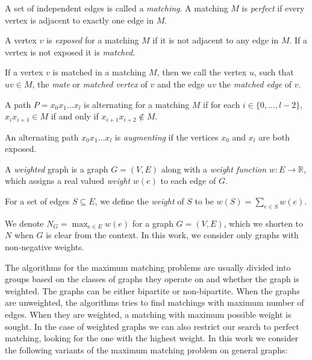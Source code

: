 \begin{defn}[matching]
    A set of independent edges is called a \emph{matching}. A matching $M$ is \emph{perfect} if every vertex is adjacent to exactly one edge in $M$.
\end{defn}

\begin{defn}
    A vertex $v$ is \emph{exposed} for a matching $M$ if it is not adjacent to any edge in $M$. If a vertex is not exposed it is \emph{matched}.
\end{defn}

If a vertex $v$ is matched in a matching $M$, then we call the vertex $u$, such that $uv \in M$, the \emph{mate} or \emph{matched vertex} of $v$ and the edge $uv$ the \emph{matched edge} of $v$.

\begin{defn}
    A path $P = x_0x_1\dots x_l$ is alternating for a matching $M$ if for each $i \in \{0, \dots, l - 2\}$, $x_i x_{i+1} \in M$ if and only if $x_{i+1}x_{i+2} \notin M$.
\end{defn}

\begin{defn}
    An alternating path $x_0x_1\dots x_l$ is \emph{augmenting} if the vertices $x_0$ and $x_l$ are both exposed.
\end{defn}

\begin{defn}
    A \emph{weighted} graph is a graph $G = (V, E)$ along with a \emph{weight function} $w : E \rightarrow \mathbb{R}$, which assigns a real valued \emph{weight} $w(e)$ to each edge of $G$.
\end{defn}

For a set of edges $S \subseteq E$, we define the \emph{weight} of $S$ to be $w(S) = \sum_{e \in S} w(e)$. 

We denote $N_G = \max_{e \in E} w(e)$ for a graph $G = (V, E)$, which we shorten to $N$ when $G$ is clear from the context. In this work, we consider only graphs with non-negative weights.

The algorithms for the maximum matching problems are usually divided into groups based on the classes of graphs they operate on and whether the graph is weighted. The graphs can be either bipartite or non-bipartite. When the graphs are unweighted, the algorithms tries to find matchings with maximum number of edges. When they are weighted, a matching with maximum possible weight is sought. In the case of weighted graphs we can also restrict our search to perfect matching, looking for the one with the highest weight. In this work we consider the following variants of the maximum matching problem on general graphs:

